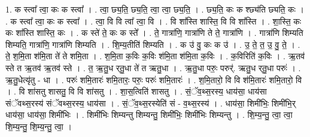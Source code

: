 \documentclass[17pt]{extarticle}
\begin{document}
1. क स्त्वा᳚ त्वा॒ कः क स्त्वा᳚ । . त्वा॒ छ्य॒ति॒ छ्य॒ति॒ त्वा॒ त्वा॒ छ्य॒ति॒ । . छ्य॒ति॒ कः क श्छ्य॑ति छ्यति॒ कः । . क स्त्वा᳚ त्वा॒ कः क स्त्वा᳚ । . त्वा॒ वि वि त्वा᳚ त्वा॒ वि । . वि शा᳚स्ति शास्ति॒ वि वि शा᳚स्ति । . शा॒स्ति॒ कः कः शा᳚स्ति शास्ति॒ कः । . क स्ते॑ ते॒ कः क स्ते᳚ । . ते॒ गात्रा॑णि॒ गात्रा॑णि ते ते॒ गात्रा॑णि । . गात्रा॑णि शिम्यति शिम्यति॒ गात्रा॑णि॒ गात्रा॑णि शिम्यति । . शि॒म्य॒तीति॑ शिम्यति । . क उ॑ वु॒ कः क उ॑ । . उ॒ ते॒ त॒ उ॒ वु॒ ते॒ । . ते॒ श॒मि॒ता श॑मि॒ता ते॑ ते शमि॒ता । . श॒मि॒ता क॒विः क॒विः श॑मि॒ता श॑मि॒ता क॒विः । . क॒विरिति॑ क॒विः । . ऋ॒तव॑ स्ते त ऋ॒तव॑ ऋ॒तव॑ स्ते । . त॒ ऋ॒तु॒ध र्‌तु॒धा ते॑ त ऋतु॒धा । . ऋ॒तु॒धा परुः॒ परुर्॑. ऋतु॒ध र्‌तु॒धा परुः॑ । . ऋ॒तु॒धेत्यृ॑तु - धा । . परुः॑ शमि॒तारः॑ शमि॒तारः॒ परुः॒ परुः॑ शमि॒तारः॑ । . श॒मि॒तारो॒ वि वि श॑मि॒तारः॑ शमि॒तारो॒ वि । . वि शा॑सतु शासतु॒ वि वि शा॑सतु । . शा॒स॒त्विति॑ शासतु । . सं॒ॅव॒थ्स॒रस्य॒ धाय॑सा॒ धाय॑सा संॅवथ्स॒रस्य॑ संॅवथ्स॒रस्य॒ धाय॑सा । . सं॒ॅव॒थ्स॒रस्येति॑ सं - व॒थ्स॒रस्य॑ । . धाय॑सा॒ शिमी॑भिः॒ शिमी॑भि॒र् धाय॑सा॒ धाय॑सा॒ शिमी॑भिः । . शिमी॑भिः शिम्यन्तु शिम्यन्तु॒ शिमी॑भिः॒ शिमी॑भिः शिम्यन्तु । . शि॒म्य॒न्तु॒ त्वा॒ त्वा॒ शि॒म्य॒न्तु॒ शि॒म्य॒न्तु॒ त्वा॒ । \newline
\end{document}
